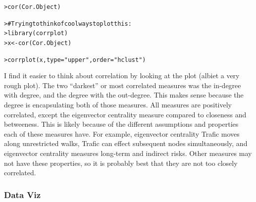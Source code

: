 \documentclass[12pt]{article}\usepackage[]{graphicx}\usepackage[]{color}
\makeatletter
\newcommand{\hlstr}[1]{\textcolor[rgb]{0.82,0.78,0.62}{#1}}%
\newcommand{\hlcom}[1]{\textcolor[rgb]{0.404,0.408,0.42}{#1}}%
\newcommand{\hlstd}[1]{\textcolor[rgb]{0.882,0.878,0.898}{#1}}%
\newcommand{\hlkwb}[1]{\textcolor[rgb]{0.902,0.675,0.196}{#1}}%
\newcommand{\hlkwc}[1]{\textcolor[rgb]{0.812,0.522,0.388}{#1}}%
\newcommand{\hlkwd}[1]{\textcolor[rgb]{0.733,0.388,0.812}{#1}}%
\newenvironment{kframe}{%
 \def\at@end@of@kframe{}%
 \ifinner\ifhmode%
  \def\at@end@of@kframe{\end{minipage}}%
  \begin{minipage}{\columnwidth}%
 \fi\fi%
 \def\FrameCommand##1{\hskip\@totalleftmargin \hskip-\fboxsep
 \colorbox{shadecolor}{##1}\hskip-\fboxsep
     \hskip-\linewidth \hskip-\@totalleftmargin \hskip\columnwidth}%
 \MakeFramed {\advance\hsize-\width
   \@totalleftmargin\z@ \linewidth\hsize
   \@setminipage}}%
 {\par\unskip\endMakeFramed%
 \at@end@of@kframe}
\newenvironment{knitrout}{}{} %
\makeatother
\begin{document}
\begin{flushleft}
\begin{center}
\begin{knitrout}
\begin{kframe}
{\ttfamily\noindent\bfseries{}}\begin{alltt}
\hlstd{> }\hlkwd{cor}\hlstd{(Cor.Object)}
\end{alltt}


{\ttfamily\noindent\bfseries\color{errorcolor}{\#\# Error in is.data.frame(x): object 'Cor.Object' not found}}\begin{alltt}
\hlstd{> }\hlcom{# Trying to think of cool ways to plot this:}
\hlstd{> }\hlkwd{library}\hlstd{(corrplot)}
\hlstd{> }\hlstd{x} \hlkwb{<-} \hlkwd{cor}\hlstd{(Cor.Object)}
\end{alltt}


{\ttfamily\noindent\bfseries\color{errorcolor}{\#\# Error in is.data.frame(x): object 'Cor.Object' not found}}\begin{alltt}
\hlstd{> }\hlkwd{corrplot}\hlstd{(x,} \hlkwc{type}\hlstd{=}\hlstr{"upper"}\hlstd{,} \hlkwc{order}\hlstd{=}\hlstr{"hclust"}\hlstd{)}
\end{alltt}


{\ttfamily\noindent\bfseries{}}\end{kframe}
\end{knitrout}
\end{center}


I find it easier to think about correlation by looking at the plot (albiet a very rough plot). The two ``darkest'' or most correlated measures was the in-degree with degree, and the degree with the out-degree. This makes sense because the degree is encapsulating both of those measures. All measures are positively correlated, except the eigenvector centrality measure compared to closeness and betweeness. This is likely because of the different assumptions and properties each of these measures have. For example, eigenvector centrality Trafic moves along unrestricted walks, Trafic can effect subsequent nodes simultaneously, and eigenvector centrality measures long-term and indirect risks. Other measures may not have these properties, so it is probably best that they are not too closely correlated.


\subsubsection{Data Viz}


\end{flushleft}
\end{document}

